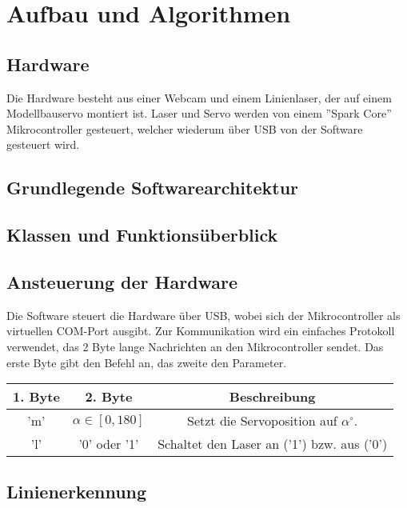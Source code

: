 \documentclass[ngerman,a4paper]{scrartcl}
\begin{document}
\section{Aufbau und Algorithmen}

\subsection{Hardware}

Die Hardware besteht aus einer Webcam und einem Linienlaser, der auf einem Modellbauservo montiert ist. Laser und Servo werden von einem ''Spark Core'' Mikrocontroller gesteuert, welcher wiederum über USB von der Software gesteuert wird.

\subsection{Grundlegende Softwarearchitektur}

\subsection{Klassen und Funktionsüberblick}

\subsection{Ansteuerung der Hardware}

Die Software steuert die Hardware über USB, wobei sich der Mikrocontroller als virtuellen COM-Port ausgibt. Zur Kommunikation wird ein einfaches Protokoll verwendet, das 2 Byte lange Nachrichten an den Mikrocontroller sendet. Das erste Byte gibt den Befehl an, das zweite den Parameter.\\

\begin{tabular}{|c|c|c|}
\hline
1. Byte & 2. Byte & Beschreibung \\
\hline
'm'\footnotemark & $\alpha \in [0,180]$ & Setzt die Servoposition auf $\alpha ^\circ$.\\
\hline
'l' & '0' oder '1' & Schaltet den Laser an ('1') bzw. aus ('0')\\
\hline
\end{tabular}



\subsection{Linienerkennung}
\end{document}
